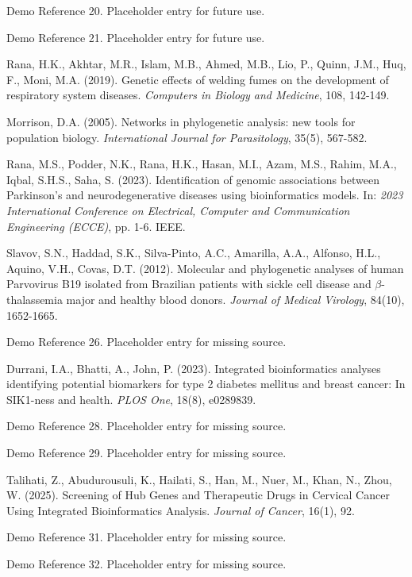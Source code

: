 \documentclass[a4paper,12pt,openbib,oneside]{memoir}
\theoremstyle{plain}
\theoremstyle{plain}
\theoremstyle{plain}
\theoremstyle{definition}
\theoremstyle{plain}
\theoremstyle{plain}
\theoremstyle{plain}
\begin{document}
\begin{thebibliography}{99}
 Demo Reference 20. Placeholder entry for future use.

 Demo Reference 21. Placeholder entry for future use.

 Rana, H.K., Akhtar, M.R., Islam, M.B., Ahmed, M.B., Lio, P., Quinn, J.M., Huq, F., Moni, M.A. (2019). Genetic effects of welding fumes on the development of respiratory system diseases. \textit{Computers in Biology and Medicine}, 108, 142-149.

 Morrison, D.A. (2005). Networks in phylogenetic analysis: new tools for population biology. \textit{International Journal for Parasitology}, 35(5), 567-582.

 Rana, M.S., Podder, N.K., Rana, H.K., Hasan, M.I., Azam, M.S., Rahim, M.A., Iqbal, S.H.S., Saha, S. (2023). Identification of genomic associations between Parkinson's and neurodegenerative diseases using bioinformatics models. In: \textit{2023 International Conference on Electrical, Computer and Communication Engineering (ECCE)}, pp. 1-6. IEEE.

 Slavov, S.N., Haddad, S.K., Silva-Pinto, A.C., Amarilla, A.A., Alfonso, H.L., Aquino, V.H., Covas, D.T. (2012). Molecular and phylogenetic analyses of human Parvovirus B19 isolated from Brazilian patients with sickle cell disease and $\beta$-thalassemia major and healthy blood donors. \textit{Journal of Medical Virology}, 84(10), 1652-1665.

 Demo Reference 26. Placeholder entry for missing source.

 Durrani, I.A., Bhatti, A., John, P. (2023). Integrated bioinformatics analyses identifying potential biomarkers for type 2 diabetes mellitus and breast cancer: In SIK1-ness and health. \textit{PLOS One}, 18(8), e0289839.

 Demo Reference 28. Placeholder entry for missing source.

 Demo Reference 29. Placeholder entry for missing source.

 Talihati, Z., Abudurousuli, K., Hailati, S., Han, M., Nuer, M., Khan, N., Zhou, W. (2025). Screening of Hub Genes and Therapeutic Drugs in Cervical Cancer Using Integrated Bioinformatics Analysis. \textit{Journal of Cancer}, 16(1), 92.

 Demo Reference 31. Placeholder entry for missing source.

 Demo Reference 32. Placeholder entry for missing source.


\end{thebibliography}
\end{document}
